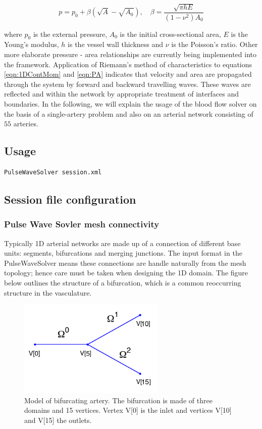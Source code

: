 \begin{equation}
p=p_{0}+\beta\left(\sqrt{A}-\sqrt{A_{0}}\right), \quad \beta=\frac{\sqrt{\pi h E}}{(1-\nu^{2})A_{0}}
\label{eqn:PA}
\end{equation}

where $p_{0}$ is the external pressure, $A_{0}$ is the initial cross-sectional area, $E$ is the Young's modulus, $h$ is the vessel wall thickness and $\nu$ is the Poisson's ratio. Other more elaborate pressure - area relationships are currently being implemented into the framework. Application of Riemann's method of characteristics to equations \ref{eqn:1DContMom} and \ref{eqn:PA} indicates that velocity and area are propagated through the system by forward and backward travelling waves. These waves are reflected and within the network by appropriate treatment of interfaces and boundaries. In the following, we will explain
the usage of the blood flow solver on the basis of a single-artery problem and
also on an arterial network consisting of $55$ arteries.

\subsection{Usage}
\begin{lstlisting}[style=BashInputStyle]
PulseWaveSolver session.xml
\end{lstlisting}

\subsection{Session file configuration}

\subsubsection{Pulse Wave Sovler mesh connectivity}
Typically 1D arterial networks are made up of a connection of different base units: segments, bifurcations and merging junctions. The input format in the PulseWaveSolver means these connections are handle naturally from the mesh topology; hence care must be taken when designing the 1D domain. The figure below outlines the structure of a bifurcation, which is a common reoccurring structure in the vasculature.

\begin{figure}
\begin{center}
\includegraphics[width=7cm]{img/PulseWaveBifurcation.png}
\caption{Model of bifurcating artery. The bifurcation is made of three domains and 15 vertices. Vertex V[0] is the inlet and vertices V[10] and V[15] the outlets.}
\end{center}
\end{figure}

